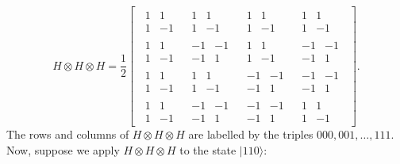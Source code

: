 \documentclass[fleqn,a4paper]{article}
\theoremstyle{definition}
\theoremstyle{definition}
\theoremstyle{definition}
\theoremstyle{definition}
\theoremstyle{remark}
\begin{document}
\[
  H\otimes H\otimes H
  = \frac{1}{2}
  \left[
  \,
    \begin{array}{c|c|c|c}
      \begin{matrix}1&1\\1&-1\end{matrix}
      & \begin{matrix}1&1\\1&-1\end{matrix}
      & \begin{matrix}1&1\\1&-1\end{matrix}
      & \begin{matrix}1&1\\1&-1\end{matrix}
    \\\hline
      \begin{matrix}1&1\\1&-1\end{matrix}
      & \begin{matrix}-1&-1\\-1&1\end{matrix}
      & \begin{matrix}1&1\\1&-1\end{matrix}
      & \begin{matrix}-1&-1\\-1&1\end{matrix}
    \\\hline
      \begin{matrix}1&1\\1&-1\end{matrix}
      & \begin{matrix}1&1\\1&-1\end{matrix}
      & \begin{matrix}-1&-1\\-1&1\end{matrix}
      & \begin{matrix}-1&-1\\-1&1\end{matrix}
    \\\hline
      \begin{matrix}1&1\\1&-1\end{matrix}
      & \begin{matrix}-1&-1\\-1&1\end{matrix}
      & \begin{matrix}-1&-1\\-1&1\end{matrix}
      & \begin{matrix}1&1\\1&-1\end{matrix}
    \end{array}
  \,
  \right].
\]
The rows and columns of \(H\otimes H\otimes H\) are labelled by the triples \(000,001,\ldots,111\).
Now, suppose we apply \(H\otimes H\otimes H\) to the state \(|110\rangle\):
\end{document}
